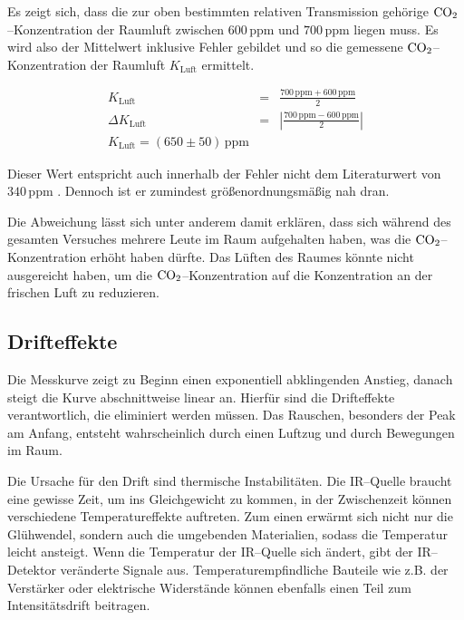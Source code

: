 \documentclass[12pt,a4paper]{scrartcl}
\numberwithin{equation}{section} %
\begin{document}
Es zeigt sich, dass  die zur oben bestimmten relativen Transmission gehörige $\ce{CO_2}$--Konzentration der Raumluft zwischen $600 \mathrm{\, ppm}$ und $700 \mathrm{\, ppm}$ liegen muss. Es wird also der Mittelwert inklusive Fehler gebildet und so die gemessene $\ce{CO_2}$--Konzentration der Raumluft $K_\mathrm{Luft}$ ermittelt.

\begin{eqnarray}
	K_\mathrm{Luft} &=& \frac{700 \mathrm{\, ppm} + 600 \mathrm{\, ppm}}{2} \\
	\Delta K_\mathrm{Luft} &=& \left|\frac{700 \mathrm{\, ppm} - 600 \mathrm{\, ppm}}{2}\right| \\
	K_\mathrm{Luft} = (650 \pm 50) \mathrm{\, ppm}
\end{eqnarray}

Dieser Wert entspricht auch innerhalb der Fehler nicht dem Literaturwert von $340 \mathrm{\, ppm}$ \cite{Demtröder Kern/Atom}. Dennoch ist er zumindest größenordnungsmäßig nah dran.

Die Abweichung lässt sich unter anderem damit erklären, dass sich während des gesamten Versuches mehrere Leute im Raum aufgehalten haben, was die $\ce{CO_2}$--Konzentration erhöht haben dürfte. Das Lüften des Raumes könnte nicht ausgereicht haben, um die $\ce{CO_2}$--Konzentration auf die Konzentration an der frischen Luft zu reduzieren.

\subsection{Drifteffekte}
\label{Drifteffekte}

Die Messkurve zeigt zu Beginn einen exponentiell abklingenden Anstieg, danach steigt die Kurve abschnittweise linear an. Hierfür sind die Drifteffekte verantwortlich, die eliminiert werden müssen. Das Rauschen, besonders der Peak am Anfang, entsteht wahrscheinlich durch einen Luftzug und durch Bewegungen im Raum.

Die Ursache für den Drift sind thermische Instabilitäten. Die IR--Quelle braucht eine gewisse Zeit, um ins Gleichgewicht zu kommen, in der Zwischenzeit können verschiedene Temperatureffekte auftreten. Zum einen erwärmt sich nicht nur die Glühwendel, sondern auch die umgebenden Materialien, sodass die Temperatur leicht ansteigt. Wenn die Temperatur der IR--Quelle sich ändert, gibt der IR--Detektor veränderte Signale aus. Temperaturempfindliche Bauteile wie z.B. der Verstärker oder elektrische Widerstände können ebenfalls einen Teil zum Intensitätsdrift beitragen.
\end{document}
